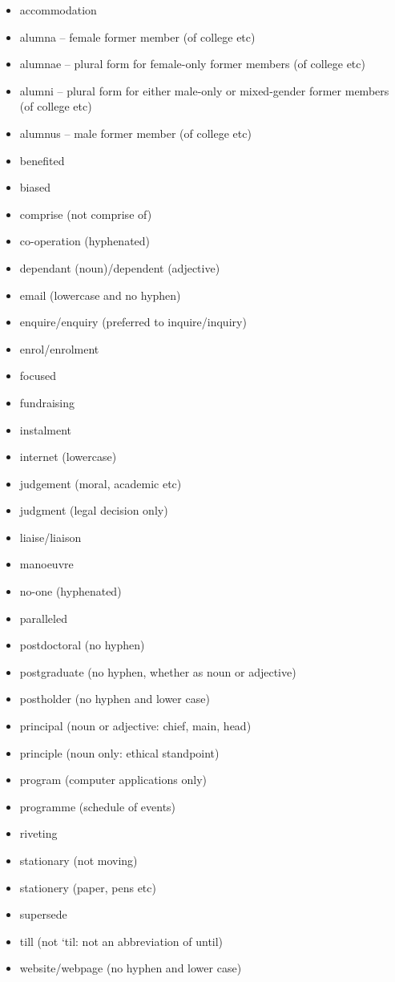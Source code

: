 \documentclass[11pt,a4paper]{book}
\newcommand{\warningmark}{{\color{cadmiumorange}}\textbf{!}}%
\begin{document}
				{\firasans \begin{mdframed}[backgroundcolor=aliceblue] 	\begin{itemize}[label=\warningmark]
						\item accommodation
						\item alumna -- female former member (of college etc)
						\item alumnae -- plural form for female-only former members (of college etc)
						\item alumni -- plural form for either male-only or mixed-gender former members (of college etc)
						\item alumnus -- male former member (of college etc)
					\item benefited
						\item biased
						\item comprise (not comprise of)
						\item co-operation (hyphenated)
						\item dependant (noun)/dependent (adjective)
						\item email (lowercase and no hyphen)
						\item enquire/enquiry (preferred to inquire/inquiry)
						\item enrol/enrolment
						\item focused
						\item fundraising
						\item instalment
						\item internet (lowercase)
						\item judgement (moral, academic etc)
						\item judgment (legal decision only)
						\item liaise/liaison
						\item manoeuvre
						\item no-one (hyphenated)
						\item paralleled
						\item postdoctoral (no hyphen)
						\item postgraduate (no hyphen, whether as noun or adjective)
						\item postholder (no hyphen and lower case)
						\item principal (noun or adjective: chief, main, head)
						\item principle (noun only: ethical standpoint)
						\item program (computer applications only)
						\item programme (schedule of events)
						\item riveting
						\item stationary (not moving)
						\item stationery (paper, pens etc)
						\item supersede
						\item till (not `til: not an abbreviation of until)
						\item website/webpage (no hyphen and lower case)
					\end{itemize} \end{mdframed} }
\end{document}
